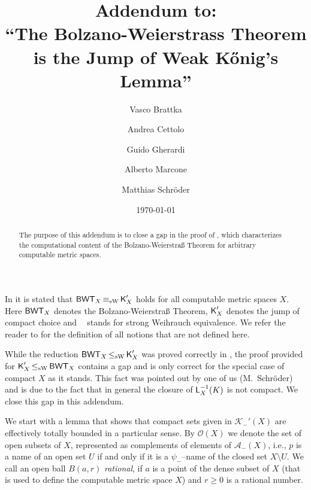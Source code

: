 \documentclass[a4paper]{amsart}
\title[Addendum to: ``The Bolzano-Weierstrass Theorem ...'']{Addendum to:\\ ``The Bolzano-Weierstrass Theorem\\ is the Jump of Weak K\H{o}nig's Lemma''}
\author[V.\ Brattka]{Vasco Brattka}
\author[A.\ Cettolo]{Andrea Cettolo}
\author[G.\ Gherardi]{Guido Gherardi}
\author[A.\ Marcone]{Alberto Marcone}
\author[M.\ Schr\"oder]{Matthias Schr\"oder}
\date{\today}
\def\AA{{\mathcal A}}
\def\KK{{\mathcal K}}
\def\OO{{\mathcal O}}
\def\BWT{\text{\rm\sffamily BWT}}
\def\K{\text{\rm\sffamily K}}
\def\L{\text{\rm\sffamily L}}
\def\leqSW{\mathop{\leq_{\mathrm{sW}}}}
\def\equivSW{\mathop{\equiv_{\mathrm{sW}}}}
\theoremstyle{definition}
\begin{document}
\maketitle


\begin{abstract}
The purpose of this addendum is to close a gap in the proof of \cite[Theorem~11.2]{BGM12},
which characterizes the computational content of the Bolzano-Weierstra\ss{} Theorem for arbitrary
computable metric spaces.
\end{abstract}




In \cite[Theorem~11.2]{BGM12} it is stated that $\BWT_X\equivSW \K_X'$ holds
for all computable metric spaces $X$.
Here $\BWT_X$ denotes the Bolzano-Weierstra\ss{} Theorem, $\K_X'$ denotes the jump of compact
choice and $\equivSW$ stands for strong Weihrauch equivalence.
We refer the reader to \cite{BGM12} for the definition of all notions that are not defined here.

While the reduction $\BWT_X\leqSW \K_X'$ was proved correctly in \cite{BGM12},
the proof provided for $\K_X'\leqSW\BWT_X$ contains a gap and is
only correct for the special case of compact $X$ as it stands.
This fact was pointed out by one of us (M.\ Schr\"oder)
and is due to the fact that in general the closure of $\L_X^{-1}(K)$ is not compact.
We close this gap in this addendum.

We start with a lemma that shows that compact sets given in $\KK_-'(X)$ are
effectively totally bounded in a particular sense. By $\OO(X)$ we denote the
set of open subsets of $X$, represented as complements of elements of
$\AA_-(X)$, i.e., $p$ is a name of an open set $U$ if and only if it is a
$\psi_-$--name of the closed set $X\setminus U$. We call an open ball
$B(a,r)$ {\em rational}, if $a$ is a point of the dense subset of $X$ (that
is used to define the computable metric space $X$) and $r \geq 0$ is a
rational number.
\end{document}
